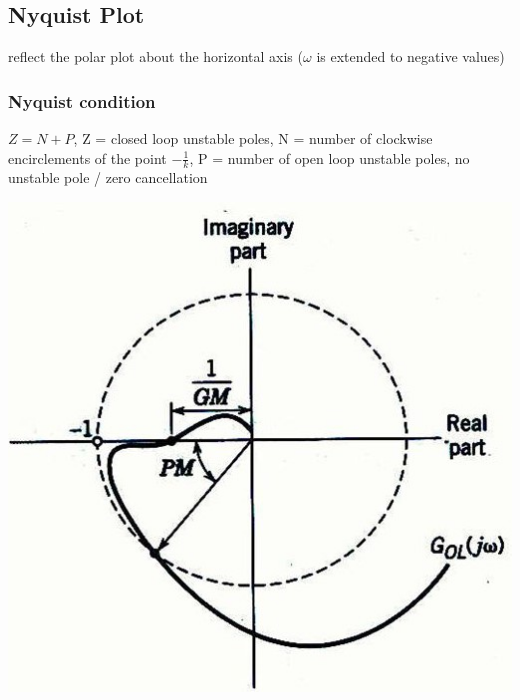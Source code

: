 \subsection{Nyquist Plot}
    \begin{minipage}{0.49\linewidth}
        reflect the polar plot about the horizontal axis ($\omega$ is extended to negative values)

    \subsubsection{Nyquist condition}
        $Z = N + P$, Z = closed loop unstable poles, N = number of clockwise encirclements of the point $-\frac{1}{k}$, P = number of open loop unstable poles, no unstable pole / zero cancellation
    \end{minipage}
    \begin{minipage}{0.49\linewidth}
        \includegraphics[width = \linewidth]{src/images/nyquist_gm_pm.jpg}
    \end{minipage}
    
    